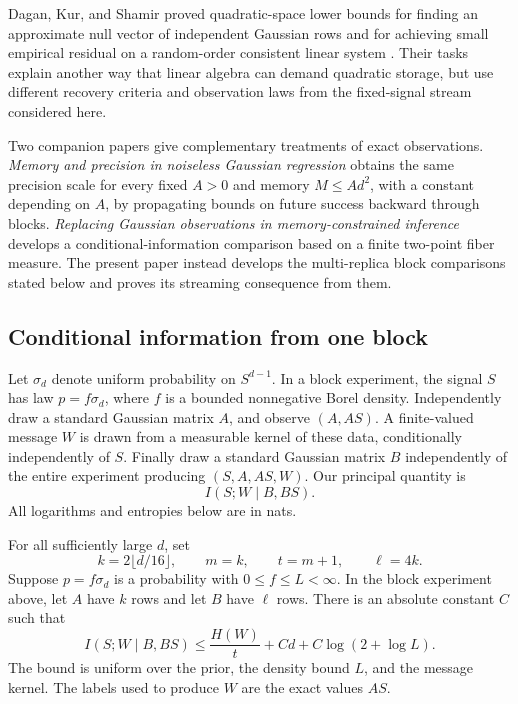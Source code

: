 Dagan, Kur, and Shamir proved quadratic-space lower bounds for finding
an approximate null vector of independent Gaussian rows and for achieving
small empirical residual on a random-order consistent linear system
\cite[Theorems~3 and~10]{DKS2019}. Their tasks explain another way that
linear algebra can demand quadratic storage, but use different recovery
criteria and observation laws from the fixed-signal stream considered here.

Two companion papers give complementary treatments of exact observations.
\emph{Memory and precision in noiseless Gaussian regression}
\cite[Theorem~1.2]{OpenAIMemoryPrecision2026} obtains the same precision
scale for every fixed $A>0$ and memory $M\le Ad^2$, with a constant depending
on $A$, by propagating bounds on future success backward through blocks.
\emph{Replacing Gaussian observations in memory-constrained inference}
\cite[Proposition~7.1 and Lemma~7.2]{OpenAIReplacing2026} develops a
conditional-information comparison based on a finite two-point fiber
measure. The present paper instead develops the multi-replica block
comparisons stated below and proves its streaming consequence from them.

\subsection*{Conditional information from one block}

Let $\sigma_d$ denote uniform probability on $S^{d-1}$. In a block
experiment, the signal $S$ has law $p=f\sigma_d$, where $f$ is a bounded
nonnegative Borel density. Independently draw a standard Gaussian matrix
$A$, and observe $(A,AS)$. A finite-valued message $W$ is drawn from a
measurable kernel of these data, conditionally independently of $S$.
Finally draw a standard Gaussian matrix $B$ independently of the entire
experiment producing $(S,A,AS,W)$. Our principal quantity is
\[
 I(S;W\mid B,BS).
\]
All logarithms and entropies below are in nats.

\begin{theorem}\label{thm:gaussian-block}
For all sufficiently large $d$, set
\[
 k=2\lfloor d/16\rfloor,\qquad m=k,\qquad t=m+1,\qquad \ell=4k.
\]
Suppose $p=f\sigma_d$ is a probability with $0\le f\le L<\infty$.
In the block experiment above, let $A$ have $k$ rows and let $B$ have
$\ell$ rows. There is an absolute constant $C$ such that
\begin{equation}\label{eq:gaussian-block}
 I(S;W\mid B,BS)
 \le \frac{H(W)}{t}+Cd+C\log(2+\log L).
\end{equation}
The bound is uniform over the prior, the density bound $L$, and the message
kernel. The labels used to produce $W$ are the exact values $AS$.
\end{theorem}

